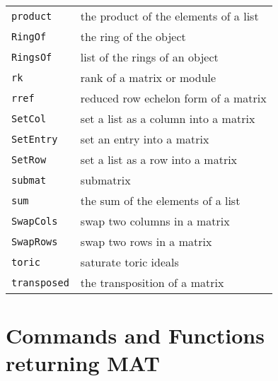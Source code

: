 \documentclass[a4paper]{mybook}
\begin{document}
\begin{center}
\begin{longtable}{ll}
{\verb~product~} &
      the product of the elements of a list\\
   
{\verb~RingOf~} &
      the ring of the object\\
   
{\verb~RingsOf~} &
      list of the rings of an object\\
   
{\verb~rk~} &
      rank of a matrix or module\\
   
{\verb~rref~} &
      reduced row echelon form of a matrix\\
   
{\verb~SetCol~} &
      set a list as a column into a matrix\\
   
{\verb~SetEntry~} &
      set an entry into a matrix\\
   
{\verb~SetRow~} &
      set a list as a row into a matrix\\
   
{\verb~submat~} &
      submatrix\\
   
{\verb~sum~} &
      the sum of the elements of a list\\
   
{\verb~SwapCols~} &
      swap two columns in a matrix\\
   
{\verb~SwapRows~} &
      swap two rows in a matrix\\
   
{\verb~toric~} &
      saturate toric ideals\\
   
{\verb~transposed~} &
      the transposition of a matrix\\
   
\end{longtable}
\end{center}

\noindent



\section{Commands and Functions returning MAT}
\label{Commands and Functions returning MAT}

        
\end{document}
